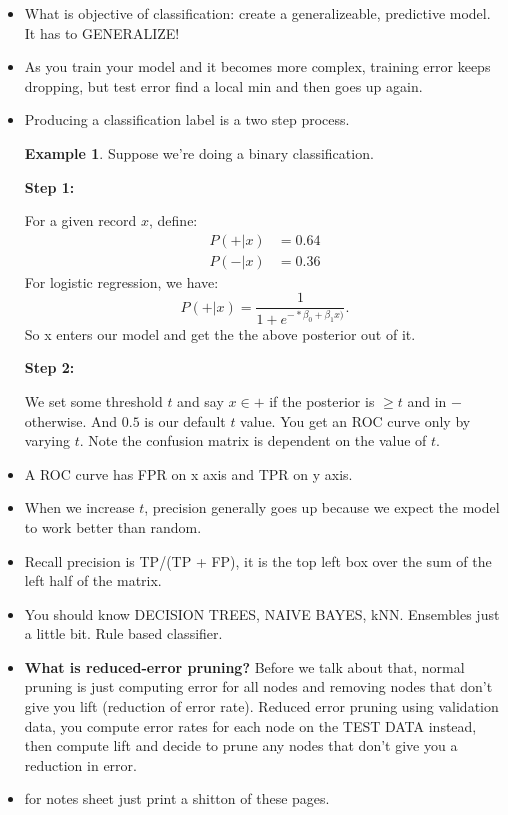 \documentclass{amsbook}
\theoremstyle{plain}
\theoremstyle{definition}
\newtheorem{Ex}[theorem]{Example}
\theoremstyle{remark}
\newcommand{\bee}{\begin{equation}\begin{aligned}}
\newcommand{\eee}{\end{aligned}\end{equation}}
\newcommand{\fracc}{\frac}
\begin{document}
\begin{itemize}
\item What is objective of classification: create a generalizeable, predictive model. It has to GENERALIZE!
\item As you train your model and it becomes more complex, training error keeps dropping, but test error find a local min and then goes up again. 
\item Producing a classification label is a two step process. 
\begin{Ex}
Suppose we're doing a binary classification. 

\textbf{Step 1: }

For a given record $x$, define:
\bee
P(+|x) &= 0.64\\
P(-|x) &= 0.36
\eee
For logistic regression, we have:
$$
P(+|x) = \fracc{1}{1 + e^{-*\beta_0 + \beta_1x)}}.
$$
So x enters our model and get the the above posterior out of it. 

\textbf{Step 2:}

We set some threshold $t$ and say $x \in +$ if the posterior is $\geq t$ and in $-$ otherwise. And $0.5$ is our default $t$ value. You get an ROC curve only by varying $t$. Note the confusion matrix is dependent on the value of $t$. 
\end{Ex}
\item A ROC curve has FPR on x axis and TPR on y axis. 
\item When we increase $t$, precision generally goes up because we expect the model to work better than random. 
\item Recall precision is TP/(TP + FP), it is the top left box over the sum of the left half of the matrix. 
\item You should know DECISION TREES, NAIVE BAYES, kNN. Ensembles just a little bit. Rule based classifier. 
\item \textbf{What is reduced-error pruning? }
Before we talk about that, normal pruning is just computing error for all nodes and removing nodes that don't give you lift (reduction of error rate). Reduced error pruning using validation data, you compute error rates for each node on the TEST DATA instead, then compute lift and decide to prune any nodes that don't give you a reduction in error. 
\item for notes sheet just print a shitton of these pages. 
\end{itemize}
\end{document}
